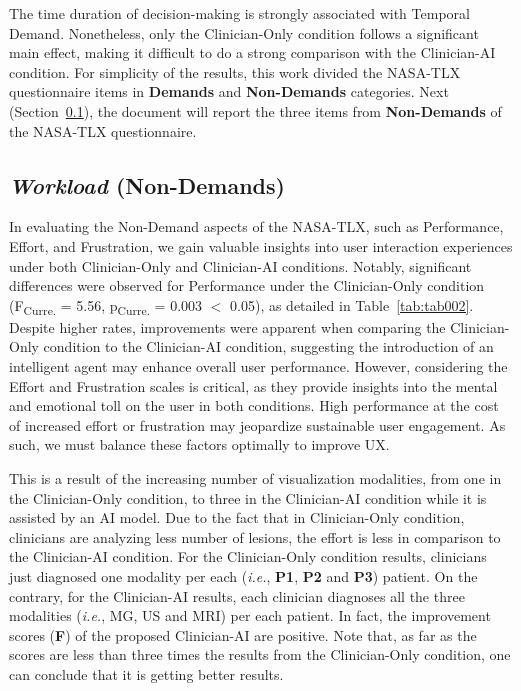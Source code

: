 The time duration of decision-making is strongly associated with Temporal Demand.
Nonetheless, only the Clinician-Only condition follows a significant main effect, making it difficult to do a strong comparison with the Clinician-AI condition.
For simplicity of the results, this work divided the \ac{NASA-TLX} questionnaire items in {\bf Demands} and {\bf Non-Demands} categories.
Next (Section~\ref{sec:app003004004}), the document will report the three items from {\bf Non-Demands} of the \ac{NASA-TLX} questionnaire.

\subsection{{\it Workload} (Non-Demands)}
\label{sec:app003004004}

In evaluating the Non-Demand aspects of the \ac{NASA-TLX}, such as Performance, Effort, and Frustration, we gain valuable insights into user interaction experiences under both Clinician-Only and Clinician-AI conditions.
Notably, significant differences were observed for Performance under the Clinician-Only condition (F\textsubscript{Curre.} = 5.56, p\textsubscript{Curre.} = 0.003 $<$ 0.05), as detailed in Table~\ref{tab:tab002}.
Despite higher rates, improvements were apparent when comparing the Clinician-Only condition to the Clinician-AI condition, suggesting the introduction of an intelligent agent may enhance overall user performance.
However, considering the Effort and Frustration scales is critical, as they provide insights into the mental and emotional toll on the user in both conditions.
High performance at the cost of increased effort or frustration may jeopardize sustainable user engagement.
As such, we must balance these factors optimally to improve \ac{UX}.



This is a result of the increasing number of visualization modalities, from one in the Clinician-Only condition, to three in the Clinician-AI condition while it is assisted by an \ac{AI} model.
Due to the fact that in Clinician-Only condition, clinicians are analyzing less number of lesions, the effort is less in comparison to the Clinician-AI condition.
For the Clinician-Only condition results, clinicians just diagnosed one modality per each ({\it i.e.}, {\bf P1}, {\bf P2} and {\bf P3}) patient.
On the contrary, for the Clinician-AI results, each clinician diagnoses all the three modalities ({\it i.e.}, \ac{MG}, \ac{US} and \ac{MRI}) per each patient.
In fact, the improvement scores (\textbf{F}) of the proposed Clinician-AI are positive.
Note that, as far as the scores are less than three times the results from the Clinician-Only condition, one can conclude that it is getting better results.


